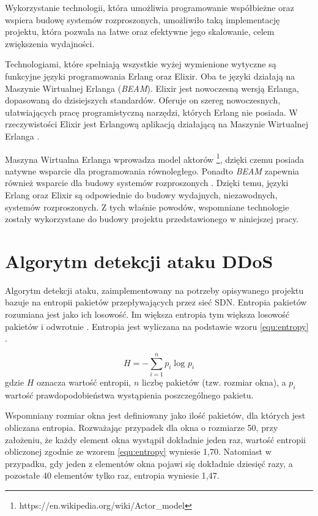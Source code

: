 Wykorzystanie technologii, która umożliwia programowanie współbieżne oraz
wspiera budowę systemów rozproszonych, umożliwiło taką implementację projektu,
która pozwala na łatwe oraz efektywne jego skalowanie, celem zwiększenia
wydajności.

Technologiami, które spełniają wszystkie wyżej wymienione wytyczne są funkcyjne
języki programowania Erlang oraz Elixir. Oba te języki działają na Maszynie
Wirtualnej Erlanga (\textit{BEAM}). Elixir jest nowoczesną wersją
Erlanga, dopasowaną do dzisiejszych standardów. Oferuje on szereg nowoczesnych,
ułatwiających pracę programistyczną narzędzi, których Erlang nie posiada. W
rzeczywistości Elixir jest Erlangową aplikacją działającą na Maszynie Wirtualnej
Erlanga \cite{thebeambook}.

Maszyna Wirtualna Erlanga wprowadza model aktorów
\footnote{https://en.wikipedia.org/wiki/Actor\_model}, dzięki czemu posiada
natywne wsparcie dla programowania równoległego. Ponadto \textit{BEAM} zapewnia
również wsparcie dla budowy systemów rozproszonych \cite{lyserlang}. Dzięki
temu, języki Erlang oraz Elixir są odpowiednie do budowy wydajnych,
niezawodnych, systemów rozproszonych. Z tych właśnie powodów, wspomniane
technologie zostały wykorzystane do budowy projektu przedstawionego w niniejszej
pracy.

\section{Algorytm detekcji ataku DDoS} \label{algorithm}

Algorytm detekcji ataku, zaimplementowany na potrzeby opisywanego projektu
bazuje na entropii pakietów przepływających przez sieć SDN. Entropia pakietów
rozumiana jest jako ich losowość. Im większa entropia tym większa losowość
pakietów i odwrotnie \cite{mainddosarticle}. Entropia jest wyliczana na
podstawie wzoru \ref{equ:entropy} \cite{mainddosarticle}.

\begin{equation}
H = -\sum_{i=1}^{n}p_{i}\log_{}p_{i}
\label{equ:entropy}
\end{equation}
gdzie $H$ oznacza wartość entropii, $n$ liczbę pakietów (tzw. rozmiar okna),
a $p_{i}$ wartość prawdopodobieństwa wystąpienia poszczególnego pakietu.

Wspomniany rozmiar okna jest definiowany jako ilość pakietów, dla których
jest obliczana entropia. Rozważając przypadek dla okna o rozmiarze 50, przy
założeniu, że każdy element okna wystąpił dokładnie jeden raz, wartość entropii
obliczonej zgodnie ze wzorem \ref{equ:entropy} wyniesie 1,70. Natomiast w
przypadku, gdy jeden z elementów okna pojawi się dokładnie dziesięć razy, a
pozostałe 40 elementów tylko raz, entropia wyniesie 1,47.

